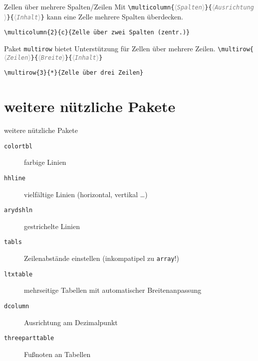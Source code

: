 \documentclass{beamer}
\newcommand{\meta}[1]{\textcolor{gray}{$\langle$\texttt{\textsl{#1}}$\rangle$}}
\begin{document}
\begin{frame}[fragile]{Zellen über mehrere Spalten/Zeilen}
Mit \verb|\multicolumn{|\meta{Spalten}\verb|}{|\meta{Ausrichtung}\verb|}{|\meta{Inhalt}\verb|}| kann eine Zelle mehrere Spalten überdecken.
\begin{lstlisting}
\multicolumn{2}{c}{Zelle über zwei Spalten (zentr.)}
\end{lstlisting}
\pause\vfill
Paket \verb|multirow| bietet Unterstützung für Zellen über mehrere Zeilen.
\verb|\multirow{|\meta{Zeilen}\verb|}{|\meta{Breite}\verb|}{|\meta{Inhalt}\verb|}|
\begin{lstlisting}
\multirow{3}{*}{Zelle über drei Zeilen}
\end{lstlisting}
\end{frame}

\section[weiteres]{weitere nützliche Pakete}
\begin{frame}[fragile]{weitere nützliche Pakete}
\begin{description}
\item[\texttt{colortbl}] farbige Linien
\item[\texttt{hhline}] vielfältige Linien (horizontal, vertikal \dots)
\item[\texttt{arydshln}] gestrichelte Linien 
\item[\texttt{tabls}] Zeilenabstände einstellen (inkompatipel zu \verb|array|!)
\item[\texttt{ltxtable}] mehrseitige Tabellen mit automatischer Breitenanpassung
\item[\texttt{dcolumn}] Ausrichtung am Dezimalpunkt %
\item[\texttt{threeparttable}] Fußnoten an Tabellen
\end{description}
\end{frame}
\end{document}
